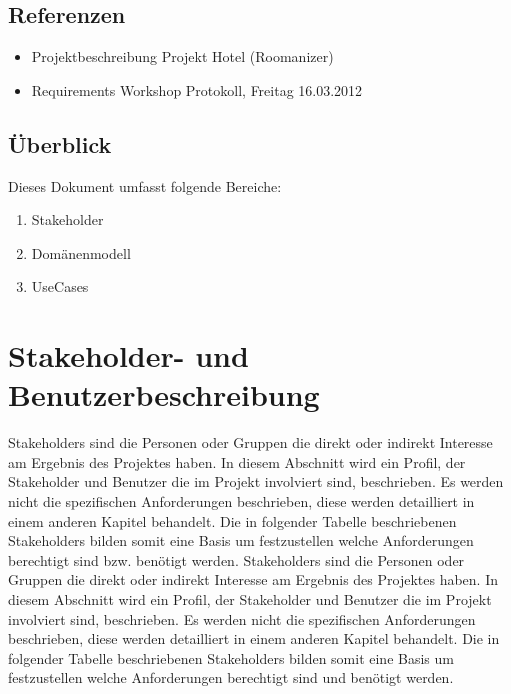 \documentclass[10pt,a4paper,titlepage]{article}
\begin{document}
\subsection{Referenzen}
\begin{itemize}
	\item Projektbeschreibung Projekt Hotel (Roomanizer) 
	\item Requirements Workshop Protokoll, Freitag 16.03.2012
\end{itemize}

\subsection{Überblick}
Dieses Dokument umfasst folgende Bereiche:
\begin{enumerate}
	\item Stakeholder
	\item Domänenmodell
	\item UseCases 
\end{enumerate}

\newpage

\section{Stakeholder- und Benutzerbeschreibung}
Stakeholders sind die Personen oder Gruppen die direkt oder indirekt Interesse am Ergebnis des Projektes haben. In diesem Abschnitt wird ein Profil, der Stakeholder und Benutzer die im Projekt involviert sind, beschrieben. Es werden nicht die spezifischen Anforderungen beschrieben, diese werden detailliert in einem anderen Kapitel behandelt. Die in folgender Tabelle beschriebenen Stakeholders bilden somit eine Basis um festzustellen welche Anforderungen berechtigt sind bzw. benötigt werden. 
Stakeholders sind die Personen oder Gruppen die direkt oder indirekt Interesse am Ergebnis des Projektes haben. In diesem Abschnitt wird ein Profil, der Stakeholder und Benutzer die im Projekt involviert sind, beschrieben. Es werden nicht die spezifischen Anforderungen beschrieben, diese werden detailliert in einem anderen Kapitel behandelt. Die in folgender Tabelle beschriebenen Stakeholders bilden somit eine Basis um festzustellen welche Anforderungen berechtigt sind und benötigt werden. 
\end{document}
